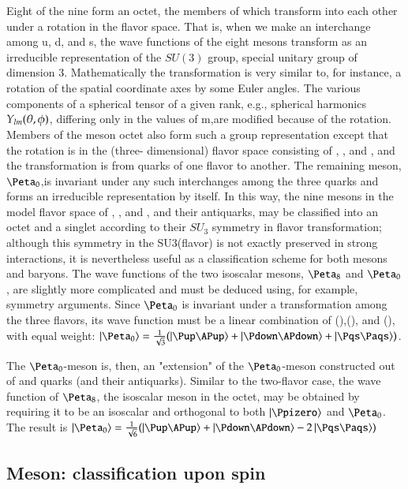 \documentclass[main.tex]{subfiles}
\begin{document}
Eight of the nine form an octet, the members of which transform into each other under a rotation in the flavor space. That is, when we make an interchange among u, d, and s, the wave functions of the eight mesons transform as an irreducible representation of the $SU(3)$ group, special unitary group of dimension 3. Mathematically the transformation is very similar to, for instance, a rotation of the spatial coordinate axes by some Euler angles. The various components of a spherical tensor of a given rank, e.g., spherical harmonics $Y_{lm}(\theta,\phi)$, differing only in the values of m,are modified because of the rotation. Members of the meson octet also form such a group representation except that the rotation is in the (three- dimensional) flavor space consisting of \Pup, \Pdown, and \Pqs, and the transformation is from quarks of one flavor to another. The remaining meson, $\Peta_0$,is invariant under any such interchanges among the three quarks and forms an irreducible representation by itself. In this way, the nine mesons in the model flavor space of \Pup, \Pdown, and \Pqs, and their antiquarks, may be classified into an octet and a singlet according to their $SU_3$ symmetry in flavor transformation; although this symmetry in the SU3(flavor) is not exactly preserved in strong interactions, it is nevertheless useful as a classification scheme for both mesons and baryons. The wave functions of the two isoscalar mesons, $\Peta_8$ and $\Peta_0$, are slightly more complicated and must be deduced using, for example, symmetry arguments. Since $\Peta_0$ is invariant under a transformation among the three flavors, its wave function must be a linear combination of (\Pup\APup),(\Pdown\APdown), and (\Pqs\Paqs), with equal weight: $\ket{\Peta_0}=\frac{1}{\sqrt{3}}(\ket{\Pup\APup}+\ket{\Pdown\APdown}+\ket{\Pqs\Paqs})$.

The $\Peta_0$-meson is, then, an "extension" of the $\Peta_0$-meson constructed out of \Pup and \Pdown quarks (and their antiquarks). Similar to the two-flavor case, the wave function of $\Peta_8$, the isoscalar meson in the octet, may be obtained by requiring it to be an isoscalar and orthogonal to both $\ket{\Ppizero}$ and $\Peta_0$. The result is $\ket{\Peta_0}=\frac{1}{\sqrt{6}}(\ket{\Pup\APup}+\ket{\Pdown\APdown}-2\ket{\Pqs\Paqs})$


\subsection{Meson: classification upon spin} 
\end{document}
